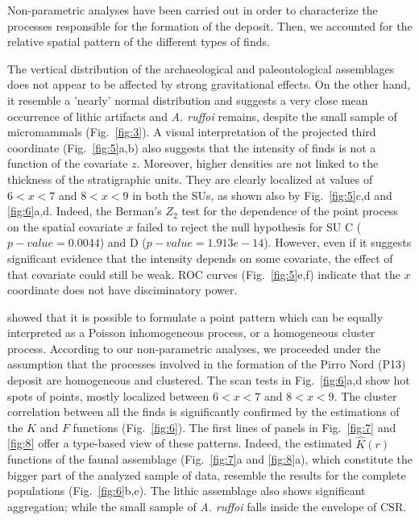 \documentclass[5p,authoryear]{elsarticle} %
\begin{document}
Non-parametric analyses have been carried out in order to characterize the processes responsible for the formation of the deposit. Then, we accounted for the relative spatial pattern of the different types of finds.

The vertical distribution of the archaeological and paleontological assemblages does not appear to be affected by strong gravitational effects. On the other hand, it resemble a 'nearly' normal distribution and suggests a very close mean occurrence of lithic artifacts and \emph{A. ruffoi} remains, despite the small sample of micromammals (Fig.~\ref{fig:3}). A visual interpretation of the projected third coordinate (Fig.~\ref{fig:5}a,b) also suggests that the intensity of finds is not a function of the covariate $z$. Moreover, higher densities are not linked to the thickness of the stratigraphic units. They are clearly localized at values of $6<x<7$ and $8<x<9$ in both the SUs, as shown also by Fig.~\ref{fig:5}c,d and \ref{fig:6}a,d. Indeed, the Berman's $Z_2$ test for the dependence of the point process on the spatial covariate $x$ failed to reject the null hypothesis for SU C ($p-value=0.0044$) and D ($p-value=1.913e-14$). However, even if it suggests significant evidence that the intensity depends on some covariate, the effect of that covariate could still be weak. ROC curves (Fig.~\ref{fig:5}e,f) indicate that the $x$ coordinate does not have disciminatory power.

\cite{Bartlett1963} showed that it is possible to formulate a point pattern which can be equally interpreted as a Poisson inhomogeneous process, or a homogeneous cluster process. According to our non-parametric analyses, we proceeded under the assumption that the processes involved in the formation of the Pirro Nord (P13) deposit are homogeneous and clustered. The scan tests in Fig.~\ref{fig:6}a,d show hot spots of points, mostly localized between $6<x<7$ and $8<x<9$. The cluster correlation between all the finds is significantly confirmed by the estimations of the $K$ and $F$ functions (Fig.~\ref{fig:6}). The first lines of panels in Fig.~\ref{fig:7} and \ref{fig:8} offer a type-based view of these patterns. Indeed, the estimated $\hat K(r)$ functions of the faunal assemblage (Fig.~\ref{fig:7}a and \ref{fig:8}a), which constitute the bigger part of the analyzed sample of data, resemble the results for the complete populations (Fig.~\ref{fig:6}b,e). The lithic assemblage also shows significant aggregation; while the small sample of \emph{A. ruffoi} falls inside the envelope of CSR.
\end{document}
